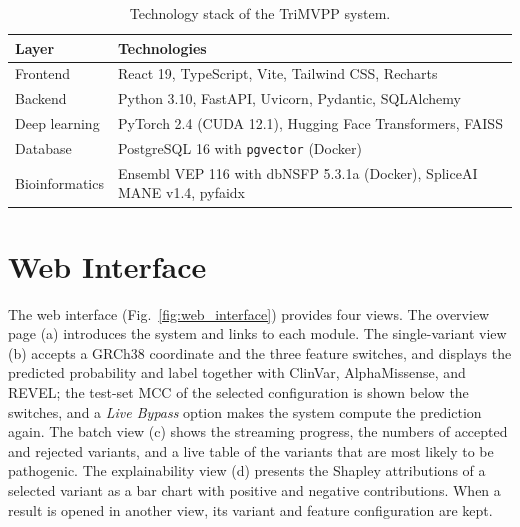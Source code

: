 \begin{table}[htbp]
    \centering
    \caption{Technology stack of the TriMVPP system.}
    \label{tab:tech_stack}
    \begin{tabular}{ll}
        \toprule
        \textbf{Layer} & \textbf{Technologies} \\
        \midrule
        Frontend & React 19, TypeScript, Vite, Tailwind CSS, Recharts \\
        Backend & Python 3.10, FastAPI, Uvicorn, Pydantic, SQLAlchemy \\
        Deep learning & PyTorch 2.4 (CUDA 12.1), Hugging Face Transformers, FAISS \\
        Database & PostgreSQL 16 with \texttt{pgvector} (Docker) \\
        Bioinformatics & Ensembl VEP 116 with dbNSFP 5.3.1a (Docker), SpliceAI MANE v1.4, pyfaidx \\
        \bottomrule
    \end{tabular}
\end{table}

\section{Web Interface}
\label{sec:web_interface}

The web interface (Fig.~\ref{fig:web_interface}) provides four views. The overview page (a) introduces the system and links to each module. The single-variant view (b) accepts a GRCh38 coordinate and the three feature switches, and displays the predicted probability and label together with ClinVar, AlphaMissense, and REVEL; the test-set MCC of the selected configuration is shown below the switches, and a \textit{Live Bypass} option makes the system compute the prediction again. The batch view (c) shows the streaming progress, the numbers of accepted and rejected variants, and a live table of the variants that are most likely to be pathogenic. The explainability view (d) presents the Shapley attributions of a selected variant as a bar chart with positive and negative contributions. When a result is opened in another view, its variant and feature configuration are kept.

